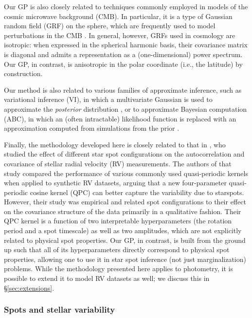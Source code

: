 \documentclass[modern]{aastex62}
\begin{document}
Our GP is also closely related to techniques commonly employed in models
of the cosmic microwave background (CMB). In particular, it is a type of
Gaussian random field (GRF) on the sphere, which are frequently used to
model perturbations in the CMB \citep{Wandelt2012}. In general, however,
GRFs used in cosmology are isotropic: when expressed in the spherical
harmonic basis, their covariance matrix is diagonal and admits a
representation as a (one-dimensional) power spectrum. Our GP, in contrast,
is anisotropic in
the polar coordinate (i.e., the latitude) by construction.

Our method is also related to various families of approximate inference, such as
variational inference (VI), in which a multivariate Gaussian is used to
approximate the \emph{posterior} distribution \citep[e.g,][]{Blei2016},
or to approximate Bayesian
computation (ABC), in which an (often intractable) likelihood function is
replaced with an approximation computed from simulations from the prior
\citep[e.g.,][]{Beaumont2019}.

Finally, the methodology developed here is closely related to that in
\citet{Perger2020}, who studied the effect of different star spot
configurations on the autocorrelation and covariance of stellar
radial velocity (RV) measurements. The authors of that study compared the
performance of various commonly used quasi-periodic kernels when applied
to synthetic RV datasets, arguing that a new four-parameter quasi-periodic
cosine kernel (QPC) can better capture the variability due to starspots.
However, their study was empirical and related spot configurations to their
effect on the covariance structure of the data primarily in a qualitative
fashion. Their QPC kernel is a function of two interpretable hyperparameters
(the rotation period and a spot timescale) as well as two amplitudes, which
are not explicitly related to physical spot properties. Our GP, in contrast,
is built from the ground up such that all of its hyperparameters directly
correspond to physical spot properties, allowing one to use it in star spot
inference (not just marginalization) problems. While the methodology presented
here applies to photometry, it is possible to extend it to model RV
datasets as well; we discuss this in \S\ref{sec:extensions}.

\subsubsection{Spots and stellar variability}
\end{document}
